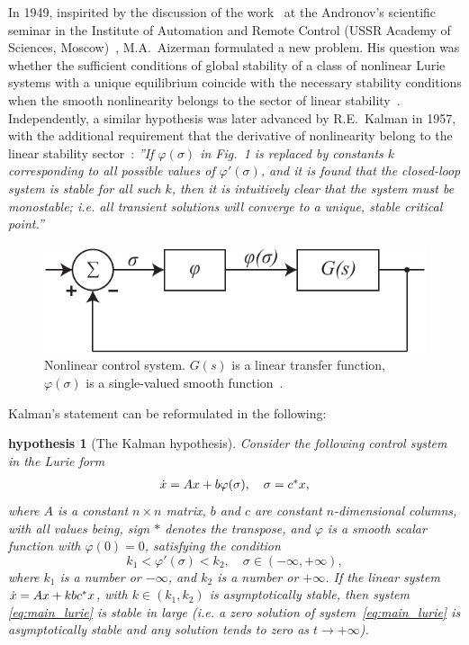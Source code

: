 \documentclass{ifacconf}
\theoremstyle{plain}
\newtheorem{hypothesis}{hypothesis}
\begin{document}
In 1949, inspirited by the discussion of the work~\citep{AndronovM-1944}
at the Andronov's scientific seminar in the Institute of Automation and Remote Control
(USSR Academy of Sciences, Moscow)~\citep{Bissell-1998},
M.A.~Aizerman formulated a new problem.
His question was whether
the sufficient conditions of global stability of
a class of nonlinear Lurie systems with a unique equilibrium
coincide with the necessary stability conditions
when the smooth nonlinearity belongs to the sector of linear stability~\citep{Aizerman-1949}.
Independently, a similar hypothesis was later advanced by R.E.~Kalman in 1957,
with the additional requirement that the derivative of nonlinearity
belong to the linear stability sector~\citep{Kalman-1957}:
\emph{''If $\varphi(\sigma)$ in Fig.~1
is replaced by constants
$k$ corresponding to all possible values of $\varphi'(\sigma)$, and
it is found that the closed-loop system is stable for
all such $k$, then it is intuitively clear that the system
must be monostable; i.e. all transient solutions
will converge to a unique, stable critical point.''}
\begin{figure}[ht]
  \centering
  \includegraphics[width=\linewidth]{FIG/KalmanScheme.pdf}
  \caption{Nonlinear control system. $G(s)$ is a linear transfer
  function, $\varphi(\sigma)$ is a single-valued smooth function~\citep{Kalman-1957}.}
  \label{fig:kalman_scheme}
\end{figure}

Kalman's statement can be reformulated in the
following:
\begin{hypothesis}[The Kalman hypothesis]
  Consider the following control system in the Lurie form
  \begin{equation}\label{eq:main_lurie}
    \begin{array}{l}
    \dot{{\rm x}} = A {\rm x} + b \varphi(\sigma),\quad \sigma = c^{*}{\rm x},
    \end{array}
  \end{equation}
  where $A$ is a constant $n \times n$ matrix, $b$ and $c$ are constant
  $n$-dimensional columns, with all values being, sign $*$
  denotes the transpose, and $\varphi$ is a smooth scalar function with $\varphi(0) = 0$,
  satisfying the condition
  \begin{equation}\label{cond:kalman}
    k_1 < \varphi'(\sigma) < k_2, \quad \sigma \in (-\infty,+\infty),
  \end{equation}
  where $k_1$ is a number or $-\infty$, and $k_2$ is a number or $+\infty$.
  If the linear system $\dot{{\rm x}} = A {\rm x} + k b c^* {\rm x}$, with $k \in (k_1, k_2)$
  is asymptotically stable, then system \eqref{eq:main_lurie}
  is stable in large (i.e. a zero solution of system~\eqref{eq:main_lurie} is asymptotically stable
  and any solution tends to zero as $t \to +\infty$).
\end{hypothesis}
\end{document}
